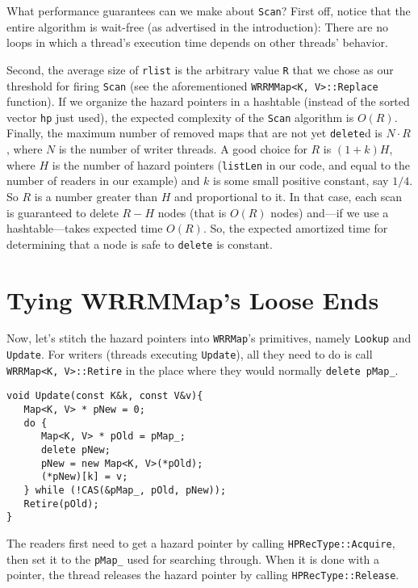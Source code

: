 \documentclass[a4paper,12pt,notitlepage,twoside,openright]{article}
\begin{document}
What performance guarantees can we make about \texttt{Scan}? First off, notice that the entire algorithm is wait-free (as advertised in the introduction): There are no loops in which a thread's execution time depends on other threads' behavior.

Second, the average size of \texttt{rlist} is the arbitrary value \texttt{R} that we chose as our threshold for firing \texttt{Scan} (see the aforementioned \texttt{WRRMMap<K, V>::Replace} function). If we organize the hazard pointers in a hashtable (instead of the sorted vector \texttt{hp} just used), the expected complexity of the \texttt{Scan} algorithm is $O(R)$. Finally, the maximum number of removed maps that are not yet \texttt{delete}d is $N \cdot R$, where $N$ is the number of writer threads. A good choice for $R$ is $(1+k)H$, where $H$ is the number of hazard pointers (\texttt{listLen} in our code, and equal to the number of readers in our example) and $k$ is some small positive constant, say $1/4$. So $R$ is a number greater than $H$ and proportional to it. In that case, each scan is guaranteed to delete $R-H$ nodes (that is $O(R)$ nodes) and---if we use a hashtable---takes expected time $O(R)$. So, the expected amortized time for determining that a node is safe to \texttt{delete} is constant.

\section{Tying WRRMMap's Loose Ends}

Now, let's stitch the hazard pointers into \texttt{WRRMap}'s primitives, namely \texttt{Lookup} and \texttt{Update}. For writers (threads executing \texttt{Update}), all they need to do is call \texttt{WRRMap<K, V>::Retire} in the place where they would normally \texttt{delete pMap\_}.

\begin{verbatim}
void Update(const K&k, const V&v){
   Map<K, V> * pNew = 0;
   do {
      Map<K, V> * pOld = pMap_;
      delete pNew;
      pNew = new Map<K, V>(*pOld);
      (*pNew)[k] = v;
   } while (!CAS(&pMap_, pOld, pNew));
   Retire(pOld);
}
\end{verbatim}

The readers first need to get a hazard pointer by calling \texttt{HPRecType::Acquire}, then set it to the \texttt{pMap\_} used for searching through. When it is done with a pointer, the thread releases the hazard pointer by calling \texttt{HPRecType::Release}.
\end{document}
